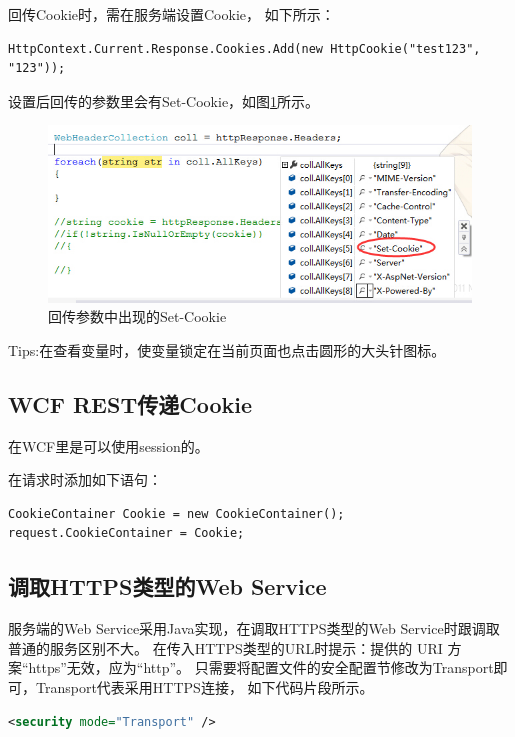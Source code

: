 \documentclass{book}
\begin{document}
回传Cookie时，需在服务端设置Cookie，
如下所示：

\begin{lstlisting}[language={[Sharp]C}]
HttpContext.Current.Response.Cookies.Add(new HttpCookie("test123", "123"));
\end{lstlisting}

设置后回传的参数里会有Set-Cookie，如图\ref{fig:HttpResponseSetCookie}所示。

\begin{figure}[htbp]
	\centering
	\includegraphics[scale=0.8]{HttpResponseSetCookie.jpg}
	\caption{回传参数中出现的Set-Cookie}
	\label{fig:HttpResponseSetCookie}
\end{figure}

Tips:在查看变量时，使变量锁定在当前页面也点击圆形的大头针图标。

\subsection{WCF REST传递Cookie}

在WCF里是可以使用session的。

在请求时添加如下语句：

\begin{lstlisting}[language={[Sharp]C}]
CookieContainer Cookie = new CookieContainer();
request.CookieContainer = Cookie;
\end{lstlisting}

\subsection{调取HTTPS类型的Web Service}

服务端的Web Service采用Java实现，在调取HTTPS类型的Web Service时跟调取普通的服务区别不大。
在传入HTTPS类型的URL时提示：提供的 URI 方案“https”无效，应为“http”。
只需要将配置文件的安全配置节修改为Transport即可，Transport代表采用HTTPS连接，
如下代码片段所示。

\begin{lstlisting}[language=XML]
<security mode="Transport" />
\end{lstlisting}
\end{document}
